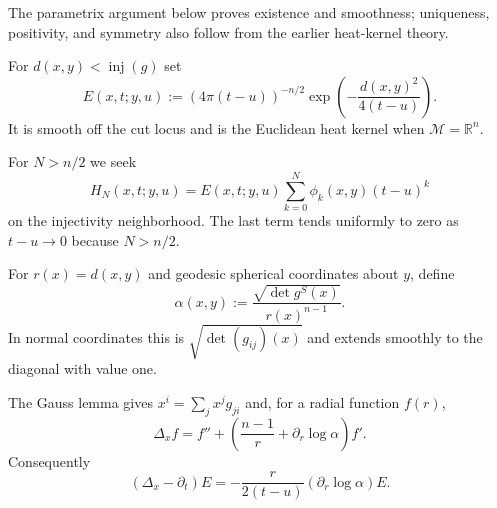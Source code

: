 \begin{remark}
\label{rem:chow-iii-ch23-properties-elsewhere}
The parametrix argument below proves existence and smoothness; uniqueness,
positivity, and symmetry also follow from the earlier heat-kernel theory.
\end{remark}

\begin{definition}
\label{def:chow-iii-ch23-transplanted-kernel}
For $d(x,y)<\operatorname{inj}(g)$ set
\[
E(x,t;y,u):=(4\pi(t-u))^{-n/2}
 \exp\!\left(-\frac{d(x,y)^2}{4(t-u)}\right).
\]
It is smooth off the cut locus and is the Euclidean heat kernel when
$\mathcal M=\mathbb R^n$.
\end{definition}

\begin{remark}
\label{rem:chow-iii-ch23-finite-approximation}
For $N>n/2$ we seek
\[
H_N(x,t;y,u)=E(x,t;y,u)\sum_{k=0}^N\phi_k(x,y)(t-u)^k
\]
on the injectivity neighborhood.  The last term tends uniformly to zero as
$t-u\to0$ because $N>n/2$.
\end{remark}

\begin{definition}
\label{def:chow-iii-ch23-normal-jacobian}
For $r(x)=d(x,y)$ and geodesic spherical coordinates about $y$, define
\[
\alpha(x,y):=\frac{\sqrt{\det g^S(x)}}{r(x)^{n-1}}.
\]
In normal coordinates this is $\sqrt{\det(g_{ij})(x)}$ and extends smoothly
to the diagonal with value one.
\end{definition}

\begin{remark}
\label{rem:chow-iii-ch23-gauss-lemma}
The Gauss lemma gives $x^i=\sum_jx^jg_{ji}$ and, for a radial function $f(r)$,
\[
\Delta_xf=f''+\left(\frac{n-1}{r}+\partial_r\log\alpha\right)f'.
\]
Consequently
\[
(\Delta_x-\partial_t)E=-\frac r{2(t-u)}(\partial_r\log\alpha)E.
\]
\end{remark}

